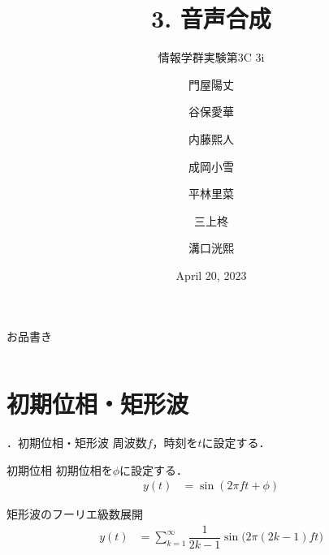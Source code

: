 \documentclass[aspectratio=43]{beamer}
\title[音声合成]{3. 音声合成}
\subtitle[]{情報学群実験第3C 3i}
\author[Group 10]{\small 門屋陽丈\and 谷保愛華\and 内藤熙人\and 成岡小雪\and 平林里菜\and 三上柊\and 溝口洸熙}
\institute[]{Group 10}
\date[2023.04.20]{April 20, 2023}
\newcommand{\showsec}{\thesection ．}
\begin{document}
\begin{frame}
    \titlepage
\end{frame}
\begin{frame}{お品書き}
    \begin{columns}[onlytextwidth,T]
        \begin{column}{.5\textwidth}
            \tableofcontents[sections={1-5}]
        \end{column}
        \begin{column}{.5\textwidth}
            \tableofcontents[sections={6-7}]
        \end{column}
    \end{columns}
\end{frame}
\section{初期位相・矩形波}
\begin{frame}[t]{\showsec 初期位相・矩形波}
    周波数\(f\)，時刻を\(t\)に設定する．
    \begin{block}{初期位相}
        初期位相を\(\phi\)に設定する．
        \begin{align}
            y(t) & = \sin(2\pi ft+\phi)
        \end{align}
    \end{block}
    \begin{block}{矩形波のフーリエ級数展開}
        \begin{align}
            y(t) & = \sum_{k=1}^{\infty}\dfrac{1}{2k-1}\sin\big(2\pi(2k-1)ft\big)
        \end{align}
    \end{block}
\end{frame}
\end{document}
